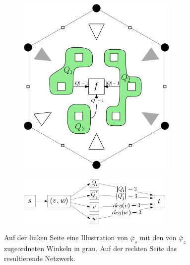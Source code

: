 \begin{figure}
\centering
\begin{subfigure}{.4\textwidth}
  \centering
  \includegraphics[width=0.9\linewidth]{6_face.png}
\end{subfigure}%
\begin{subfigure}{.6\textwidth}
  \centering
  \includegraphics[width=0.9\linewidth]{schnyder_flow_non_int.png}
\end{subfigure}
\caption{Auf der linken Seite eine Illustration von $\overline{\varphi}_s$ mit den von $\overline{\varphi}_z$ zugeordneten Winkeln in grau. Auf der rechten Seite das resultierende Netzwerk.}
\end{figure}

